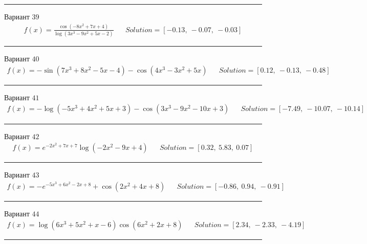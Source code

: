 \documentclass[11pt]{report}
\begin{document}
\begin{center}
    \noindent\rule{8cm}{0.4pt}
\end{center}
Вариант \(39\)
\begin{align*}
    f(x) = \frac{\cos{\left(- 8 x^{2} + 7 x + 4 \right)}}{\log{\left(3 x^{3} - 9 x^{2} + 5 x - 2 \right)}} && Solution = \left[ -0.13, \  -0.07, \  -0.03\right]
\end{align*}
\begin{center}
    \noindent\rule{8cm}{0.4pt}
\end{center}
Вариант \(40\)
\begin{align*}
    f(x) = - \sin{\left(7 x^{3} + 8 x^{2} - 5 x - 4 \right)} - \cos{\left(4 x^{3} - 3 x^{2} + 5 x \right)} && Solution = \left[ 0.12, \  -0.13, \  -0.48\right]
\end{align*}
\begin{center}
    \noindent\rule{8cm}{0.4pt}
\end{center}
Вариант \(41\)
\begin{align*}
    f(x) = - \log{\left(- 5 x^{3} + 4 x^{2} + 5 x + 3 \right)} - \cos{\left(3 x^{3} - 9 x^{2} - 10 x + 3 \right)} && Solution = \left[ -7.49, \  -10.07, \  -10.14\right]
\end{align*}
\begin{center}
    \noindent\rule{8cm}{0.4pt}
\end{center}
Вариант \(42\)
\begin{align*}
    f(x) = e^{- 2 x^{2} + 7 x + 7} \log{\left(- 2 x^{2} - 9 x + 4 \right)} && Solution = \left[ 0.32, \  5.83, \  0.07\right]
\end{align*}
\begin{center}
    \noindent\rule{8cm}{0.4pt}
\end{center}
Вариант \(43\)
\begin{align*}
    f(x) = - e^{- 5 x^{3} + 6 x^{2} - 2 x + 8} + \cos{\left(2 x^{2} + 4 x + 8 \right)} && Solution = \left[ -0.86, \  0.94, \  -0.91\right]
\end{align*}
\begin{center}
    \noindent\rule{8cm}{0.4pt}
\end{center}
Вариант \(44\)
\begin{align*}
    f(x) = \log{\left(6 x^{3} + 5 x^{2} + x - 6 \right)} \cos{\left(6 x^{2} + 2 x + 8 \right)} && Solution = \left[ 2.34, \  -2.33, \  -4.19\right]
\end{align*}
\begin{center}
    \noindent\rule{8cm}{0.4pt}
\end{center}
\end{document}
